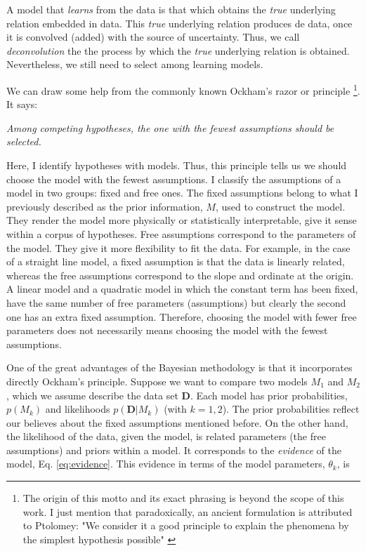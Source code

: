 A model that \emph{learns} from the data is that which obtains the \emph{true} underlying relation embedded in data.  This \emph{true} underlying relation produces de data, once it is convolved (added) with the source of uncertainty. Thus, we call \emph{deconvolution} the the process by which the \emph{true} underlying relation is obtained. Nevertheless, we still need to select among learning models.  

We can draw some help from the commonly known Ockham's razor or principle \footnote{The origin of this motto and its exact phrasing is beyond the scope of this work. I just mention that paradoxically, an ancient formulation is attributed to Ptolomey: "We consider it a good principle to explain the phenomena by the simplest hypothesis possible" \citep{Franklin2001}}. It says:

\textit{Among competing hypotheses, the one with the fewest assumptions should be selected.}

Here, I identify hypotheses with models. Thus, this principle tells us we should choose the model with the fewest assumptions. I classify the assumptions of a model in two groups: fixed and free ones. The fixed assumptions belong to what I previously described as the prior information, $M$, used to construct the model. They render the model more physically or statistically interpretable, give it sense within a corpus of hypotheses. Free assumptions correspond to the parameters of the model. They give it more flexibility to fit the data. For example, in the case of a straight line model, a fixed assumption is that the data is linearly related, whereas the free assumptions correspond to the slope and ordinate at the origin. A linear model and a quadratic model in which the constant term has been fixed, have the same number of free parameters (assumptions) but clearly the second one has an extra fixed assumption. Therefore, choosing the model with fewer free parameters does not necessarily means choosing the model with the fewest assumptions.

One of the great advantages of the Bayesian methodology is that it incorporates directly Ockham's principle. Suppose we want to compare two models $M_1$ and $M_2$, which we assume describe the data set $\mathbf{D}$. Each model has prior probabilities, $p(M_k)$ and likelihoods $p(\mathbf{D}|M_k)$ (with $k=1,2$). The prior probabilities reflect our believes about the fixed assumptions mentioned before. On the other hand, the likelihood of the data, given the model, is related parameters (the free assumptions) and priors within a model. It corresponds to the \emph{evidence} of the model, Eq. \ref{eq:evidence}. This evidence in terms of the model parameters, $\theta_k$, is

